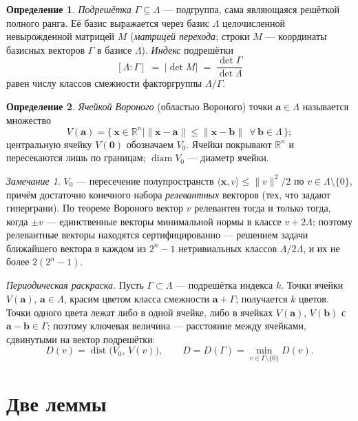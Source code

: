 \documentclass[12pt]{article}
\theoremstyle{plain}
\theoremstyle{definition}
\newtheorem{definition}{Определение}
\theoremstyle{remark}
\newtheorem{remark}{Замечание}
\newcommand{\RR}{\mathbb{R}}
\DeclareMathOperator{\diam}{diam}
\DeclareMathOperator{\dist}{dist}
\begin{document}
\begin{definition}
\emph{Подрешётка} $\Gamma\subseteq\Lambda$ --- подгруппа, сама являющаяся
решёткой полного ранга. Её базис выражается через базис $\Lambda$
целочисленной невырожденной матрицей $M$ (\emph{матрицей перехода}; строки
$M$ --- координаты базисных векторов $\Gamma$ в базисе $\Lambda$).
\emph{Индекс} подрешётки
\[
[\Lambda:\Gamma] \;=\; |\det M| \;=\; \frac{\det\Gamma}{\det\Lambda}
\]
равен числу классов смежности факторгруппы $\Lambda/\Gamma$.
\end{definition}

\begin{definition}
\emph{Ячейкой Вороного} (областью Вороного) точки $\mathbf{a}\in\Lambda$
называется множество
\[
V(\mathbf{a})=\{\,\mathbf{x}\in\RR^n \mid
\|\mathbf{x}-\mathbf{a}\|\le\|\mathbf{x}-\mathbf{b}\|
\ \ \forall\,\mathbf{b}\in\Lambda\,\};
\]
центральную ячейку $V(\mathbf{0})$ обозначаем $V_0$. Ячейки покрывают
$\RR^n$ и пересекаются лишь по границам; $\diam V_0$ --- диаметр ячейки.
\end{definition}

\begin{remark}\label{rem:relevant}
$V_0$ --- пересечение полупространств
$\langle\mathbf{x},v\rangle\le\|v\|^2/2$ по $v\in\Lambda\setminus\{0\}$,
причём достаточно конечного набора \emph{релевантных} векторов (тех, что
задают гиперграни). По теореме Вороного вектор $v$ релевантен тогда и только
тогда, когда $\pm v$ --- единственные векторы минимальной нормы в классе
$v+2\Lambda$; поэтому релевантные векторы находятся сертифицированно ---
решением задачи ближайшего вектора в каждом из $2^n-1$ нетривиальных классов
$\Lambda/2\Lambda$, и их не более $2(2^n-1)$.
\end{remark}

\emph{Периодическая раскраска.} Пусть $\Gamma\subset\Lambda$ --- подрешётка
индекса $k$. Точки ячейки $V(\mathbf{a})$, $\mathbf{a}\in\Lambda$, красим
цветом класса смежности $\mathbf{a}+\Gamma$; получается $k$ цветов. Точки
одного цвета лежат либо в одной ячейке, либо в ячейках $V(\mathbf{a})$,
$V(\mathbf{b})$ с $\mathbf{a}-\mathbf{b}\in\Gamma$; поэтому ключевая величина
--- расстояние между ячейками, сдвинутыми на вектор подрешётки:
\[
D(v)=\dist\bigl(V_0,\,V(v)\bigr),\qquad
D=D(\Gamma)=\min_{v\in\Gamma\setminus\{0\}} D(v).
\]

\section{Две леммы}
\end{document}
